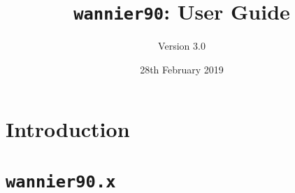 \documentclass[a4paper,11pt,twoside]{book}
\title{{\tt wannier90}: User Guide}
\author{Version 3.0}
\date{28th February 2019}
\begin{document}
\newcommand{\wannier}{\texttt{wannier90}}
\newcommand{\postw}{\texttt{postw90}}
\newcommand{\bw}{\texttt{BoltzWann}}
\newcommand{\pwscf}{\textsc{pwscf}}
\newcommand{\QE}{\textsc{quantum-espresso}}
\newcommand{\Mkb}{\mathbf{M}^{(\mathbf{k},\mathbf{b})}}
\newcommand{\Ak}{\mathbf{A}^{(\mathbf{k})}}
\newcommand{\Uk}{\mathbf{U}^{(\mathbf{k})}}
\newcommand{\cond}{\item[$\star$]}
\newcommand{\omi}{\Omega_{\mathrm{I}}}
\newcommand{\omt}{\widetilde{\Omega}}
\newcommand{\bvec}[1]{\bm{\mathrm{#1}}}


\def\nn{\nonumber\\}
\def\dk{[d\kk]}
\def\im{{\rm Im}}
\def\re{{\rm Re}}
\def\tr{{\rm Tr}}
\def\beq{\begin{equation}}
\def\eeq{\end{equation}}
\def\bea{\begin{eqnarray}}
\def\eea{\end{eqnarray}}
\def\ket#1{\vert#1\rangle}
\def\bra#1{\langle#1\vert}
\def\ip#1#2{\langle#1\vert#2\rangle}
\def\me#1#2#3{\langle#1\vert#2\vert#3\rangle}
\def\wt#1{\widetilde{#1}}
\def\kpar{{\boldsymbol\kappa}}
\def\T{\mathcal T}
\def\P{\mathcal P}
\def\ww{\omega}
\def\kk{{\bm k}}
\def\KK{{\bm K}}
\def\kz{K_z}
\def\qq{{\bm q}}
\def\rr{{\bm r}}
\def\RR{{\bm R}}
\def\GG{{\bm G}}
\def\EE{{\bm E}}
\def\BB{{\bm B}}
\def\MM{{\bm M}}
\def\jj{{\bm j}}
\def\E{{\mathcal E}}
\def\bE{{\bm{\mathcal E}}}
\def\ee{\hat{\bm e}}
\def\eps{\epsilon}
\def\vareps{\varepsilon}
\def\alfa{{\mathfrak a}}
\newcommand{\eq}[1]{Eq.~(\ref{eq:#1})}
\newcommand{\eqs}[2]{Eqs.~(\ref{eq:#1}) and~(\ref{eq:#2})}





\maketitle


\tableofcontents



\part{Introduction}



\part{\texttt{wannier90.x}\label{part:w90}}
\end{document}
